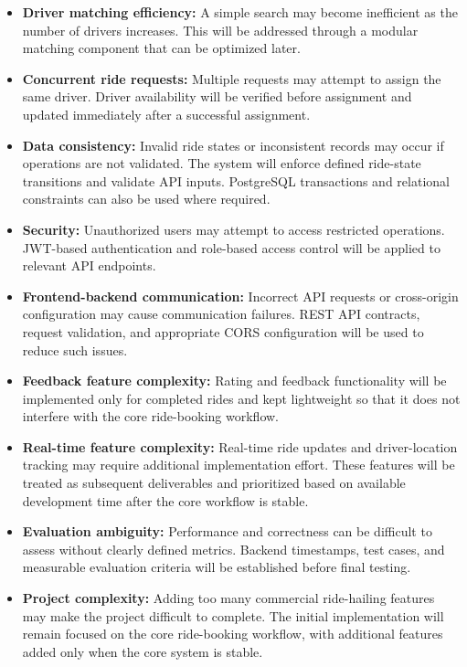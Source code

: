 \documentclass[11pt,a4paper]{article}
\begin{document}
\begin{itemize}

    \item \textbf{Driver matching efficiency:} A simple search may
    become inefficient as the number of drivers increases. This will
    be addressed through a modular matching component that can be
    optimized later.

    \item \textbf{Concurrent ride requests:} Multiple requests may
    attempt to assign the same driver. Driver availability will be
    verified before assignment and updated immediately after a
    successful assignment.

    \item \textbf{Data consistency:} Invalid ride states or
    inconsistent records may occur if operations are not validated.
    The system will enforce defined ride-state transitions and
    validate API inputs. PostgreSQL transactions and relational
    constraints can also be used where required.

    \item \textbf{Security:} Unauthorized users may attempt to access
    restricted operations. JWT-based authentication and role-based
    access control will be applied to relevant API endpoints.

    \item \textbf{Frontend-backend communication:} Incorrect API
    requests or cross-origin configuration may cause communication
    failures. REST API contracts, request validation, and appropriate
    CORS configuration will be used to reduce such issues.

    \item \textbf{Feedback feature complexity:} Rating and feedback
    functionality will be implemented only for completed rides and
    kept lightweight so that it does not interfere with the core
    ride-booking workflow.

    \item \textbf{Real-time feature complexity:} Real-time ride
    updates and driver-location tracking may require additional
    implementation effort. These features will be treated as
    subsequent deliverables and prioritized based on available
    development time after the core workflow is stable.

    \item \textbf{Evaluation ambiguity:} Performance and correctness
    can be difficult to assess without clearly defined metrics.
    Backend timestamps, test cases, and measurable evaluation
    criteria will be established before final testing.

    \item \textbf{Project complexity:} Adding too many commercial
    ride-hailing features may make the project difficult to complete.
    The initial implementation will remain focused on the core
    ride-booking workflow, with additional features added only when
    the core system is stable.

\end{itemize}
\end{document}
